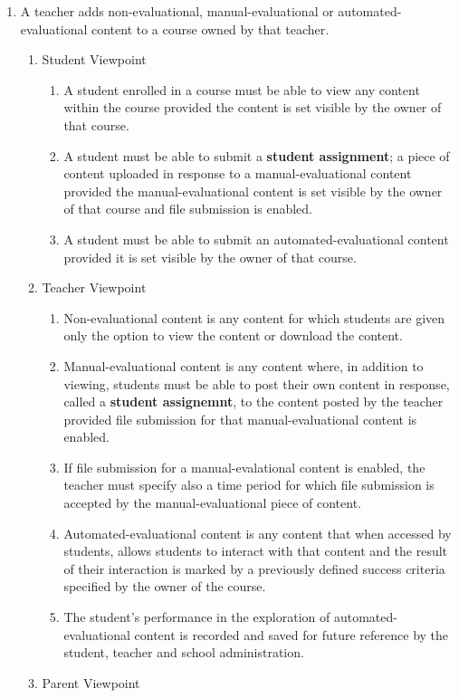 \documentclass[]{article}
\begin{document}
\begin{enumerate}[{BE}1.]
	\item A teacher adds non-evaluational, manual-evaluational or automated-evaluational content to a course owned by that teacher.
	\begin{enumerate}[{VP1}.1]
		\item Student Viewpoint
			\begin{enumerate}
				\item A student enrolled in a course must be able to view any content within the course provided the content is set visible by the owner of that course.
				\item A student must be able to submit a \textbf{student assignment}; a piece of content uploaded in response to a manual-evaluational content provided the manual-evaluational content is set visible by the owner of that course and file submission is enabled.
				\item A student must be able to submit an automated-evaluational content provided it is set visible by the owner of that course.
			\end{enumerate}
		\item Teacher Viewpoint
			\begin{enumerate}
				\item Non-evaluational content is any content for which students are given only the option to view the content or download the content.
				\item Manual-evaluational content is any content where, in addition to viewing, students must be able to post their own content in response, called a \textbf{student assignemnt}, to the content posted by the teacher provided file submission for that manual-evaluational content is enabled.
				\item If file submission for a manual-evalational content is enabled, the teacher must specify also a time period for which file submission is accepted by the manual-evaluational piece of content.
				\item Automated-evaluational content is any content that when accessed by students, allows students to interact with that content and the result of their interaction is marked by a previously defined success criteria specified by the owner of the course.
				\item The student's performance in the exploration of automated-evaluational content is recorded and saved for future reference by the student, teacher and school administration.
			\end{enumerate}
		\item Parent Viewpoint

\end{enumerate}
\end{enumerate}
\end{document}
